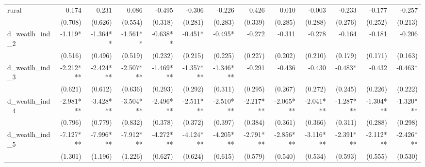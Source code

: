 \begin{tabular}{lrrrrrrrrrrrr}
rural                                       &        0.174 &        0.231 &        0.086 &       -0.495 &       -0.306 &       -0.226 &        0.426 &        0.010 &       -0.003 &       -0.233 &       -0.177 &       -0.257 \\ 
                                            &      (0.708) &      (0.626) &      (0.554) &      (0.318) &      (0.281) &      (0.283) &      (0.339) &      (0.285) &      (0.288) &      (0.276) &      (0.252) &      (0.213) \\ 
d\_weatlh\_ind\_2                           &      -1.119* &     -1.364** &     -1.561** &     -0.638** &      -0.451* &      -0.495* &       -0.272 &       -0.311 &       -0.278 &       -0.164 &       -0.181 &       -0.206 \\ 
                                            &      (0.516) &      (0.496) &      (0.519) &      (0.232) &      (0.215) &      (0.225) &      (0.227) &      (0.202) &      (0.210) &      (0.179) &      (0.171) &      (0.163) \\ 
d\_weatlh\_ind\_3                           &    -2.212*** &    -2.424*** &    -2.507*** &    -1.469*** &    -1.357*** &    -1.346*** &       -0.291 &       -0.436 &       -0.430 &      -0.483* &       -0.432 &      -0.463* \\ 
                                            &      (0.621) &      (0.612) &      (0.636) &      (0.293) &      (0.292) &      (0.311) &      (0.295) &      (0.267) &      (0.272) &      (0.245) &      (0.226) &      (0.222) \\ 
d\_weatlh\_ind\_4                           &    -2.981*** &    -3.428*** &    -3.504*** &    -2.496*** &    -2.511*** &    -2.510*** &    -2.217*** &    -2.065*** &    -2.041*** &    -1.287*** &    -1.304*** &    -1.320*** \\ 
                                            &      (0.796) &      (0.779) &      (0.832) &      (0.378) &      (0.372) &      (0.397) &      (0.384) &      (0.361) &      (0.366) &      (0.311) &      (0.288) &      (0.298) \\ 
d\_weatlh\_ind\_5                           &    -7.127*** &    -7.996*** &    -7.912*** &    -4.272*** &    -4.124*** &    -4.205*** &    -2.791*** &    -2.856*** &    -3.116*** &    -2.391*** &    -2.112*** &    -2.426*** \\ 
                                            &      (1.301) &      (1.196) &      (1.226) &      (0.627) &      (0.624) &      (0.615) &      (0.579) &      (0.540) &      (0.534) &      (0.593) &      (0.555) &      (0.530) \\ 

\end{tabular}
